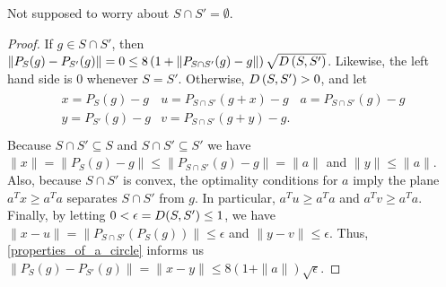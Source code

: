 \begin{boxedcomment}
Not supposed to worry about $S \cap S' = \emptyset$.
\end{boxedcomment}

\begin{proof}


If $g \in S \cap S'$, then $\left\|P_S(g) - P_{S'}(g)\right\| = 0 \le 8\left(1 + \|P_{S \cap S'}(g) - g\|\right) \sqrt{{D}\left(S, S'\right)}$.
Likewise, the left hand side is $0$ whenever $S = S'$.
Otherwise, ${D}\left(S, S'\right) > 0$, and let 
\begin{align*}
\begin{array}{ccc}
x = P_S(g) - g      & u = P_{S \cap S'}(g + x) - g & a = P_{S \cap S'}(g) - g \\
y = P_{S'}(g) - g   & v = P_{S \cap S'}(g + y) - g. &  \\
\end{array}
\end{align*}
Because $S \cap S' \subseteq S$ and $S \cap S' \subseteq S'$ we have
$\|x\| = \|P_S(g) - g\| \le \|P_{S \cap S'} (g) - g\| = \|a\|$ and $\|y\| \le \|a\|$.
Also, because $S \cap S'$ is convex, the optimality conditions for $a$ imply the plane $a^Tx \ge a^Ta$ separates $S \cap S'$ from $g$.
In particular, $a^Tu \ge a^Ta$ and $a^Tv \ge a^Ta$.
Finally, by letting $0 < \epsilon = {D}(S, S') \le 1$, we have $\|x - u\| = \|P_{S \cap S'}\left(P_S(g)\right)\| \le \epsilon$ and $\|y - v\| \le \epsilon$.
Thus, \cref{properties_of_a_circle} informs us
$\|P_S(g) - P_{S'}(g)\| = \|x - y\| \le 8(1 + \|a\|) \sqrt{\epsilon}$.
\end{proof}


